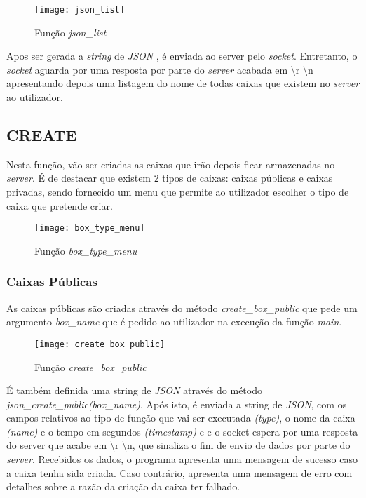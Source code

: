 \documentclass{report}
\begin{document}
\FloatBarrier
\begin{figure}[h]
\center
\texttt{[image: json\_list]}
\caption{Função \textit{json\_list}}
\label{fig:json_list}
\end{figure}

Apos ser gerada a \textit{string} de \textit{JSON} , é enviada ao server pelo \textit{socket}. Entretanto, o \textit{socket} aguarda por uma resposta por parte do \textit{server} acabada em \textbackslash r \textbackslash n apresentando depois uma listagem do nome de todas caixas que existem no \textit{server} ao utilizador.

\newpage
\FloatBarrier
\subsection{CREATE}
Nesta função, vão ser criadas as caixas que irão depois ficar armazenadas no \textit{server}. É de destacar que existem 2 tipos de caixas: caixas públicas e caixas privadas, sendo fornecido um menu que permite ao utilizador escolher o tipo de caixa que pretende criar.

\begin{figure}[h]
\center
\texttt{[image: box\_type\_menu]}
\caption{Função \textit{box\_type\_menu}}
\label{fig:box_type_menu}
\end{figure}
\subsubsection{Caixas Públicas}

As caixas públicas são criadas através do método \textit{create\_box\_public} que pede um argumento \textit{box\_name} que é pedido ao utilizador na execução da função \textit{main}.

\begin{figure}[h]
\center
\texttt{[image: create\_box\_public]}
\caption{Função \textit{create\_box\_public}}
\label{fig:create_box_public}
\end{figure}

É também definida uma string de \textit{JSON} através do método \textit{json\_create\_public(box\_name)}.
Após isto, é enviada a string de \textit{JSON}, com os campos relativos ao tipo de função que vai ser executada \textit{(type)}, o nome da caixa \textit{(name)} e o tempo em segundos \textit{(timestamp)} e e o socket espera por uma resposta do server que acabe em \textbackslash r \textbackslash n, que sinaliza o fim de envio de dados por parte do \textit{server}. Recebidos os dados, o programa apresenta uma mensagem de sucesso caso a caixa tenha sida criada. Caso contrário, apresenta uma mensagem de erro com detalhes sobre a razão da criação da caixa ter falhado.
\end{document}
